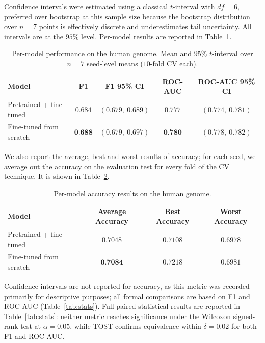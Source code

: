 \documentclass[11pt,a4paper,twoside]{article}
\begin{document}
Confidence intervals were estimated using a classical $t$-interval with $df = 6$, preferred over bootstrap at this sample size because the bootstrap distribution over $n = 7$ points is effectively discrete and underestimates tail uncertainty. All intervals are at the $95\%$ level. Per-model results are reported in Table~\ref{tab:human_eval}.

\begin{table}[h]
	\centering
	\caption{Per-model performance on the human genome. Mean and $95\%$ $t$-interval over $n = 7$ seed-level means ($10$-fold CV each).}
	\label{tab:human_eval}
	\begin{tabular}{lcccc}
		\toprule
		\textbf{Model} & \textbf{F1} & \textbf{F1 95\% CI} & \textbf{ROC-AUC} & \textbf{ROC-AUC 95\% CI} \\
		\midrule
		Pretrained + fine-tuned & $0.684$ & $(0.679,\ 0.689)$ & $0.777$ & $(0.774,\ 0.781)$ \\
		Fine-tuned from scratch           & $\textbf{0.688}$ & $(0.679,\ 0.697)$ & $\textbf{0.780}$ & $(0.778,\ 0.782)$ \\
		\bottomrule
	\end{tabular}
\end{table}

We also report the average, best and worst results of accuracy; for each seed, we average out the accuracy on the evaluation test for every fold of the CV technique. It is shown in Table~\ref{tab:human_eval_acc}. 

\begin{table}[h]
	\centering
	\caption{Per-model accuracy results on the human genome.}
	\label{tab:human_eval_acc}
	\begin{tabular}{lccc}
		\toprule
		\textbf{Model} & \textbf{Average Accuracy} & \textbf{Best Accuracy} & \textbf{Worst Accuracy} \\
		\midrule
		Pretrained + fine-tuned & $0.7048$ & $0.7108$ & $0.6978$ \\
		Fine-tuned from scratch & $\textbf{0.7084}$ & $0.7218$ & $0.6981$ \\
		\bottomrule
	\end{tabular}
\end{table}

Confidence intervals are not reported for accuracy, as this metric
was recorded primarily for descriptive purposes; all formal
comparisons are based on F1 and ROC-AUC (Table~\ref{tab:stats}).
Full paired statistical results are reported in Table~\ref{tab:stats}: neither metric reaches significance under the Wilcoxon signed-rank test at $\alpha = 0.05$, while TOST confirms equivalence within $\delta = 0.02$ for both F1 and ROC-AUC.
\end{document}
